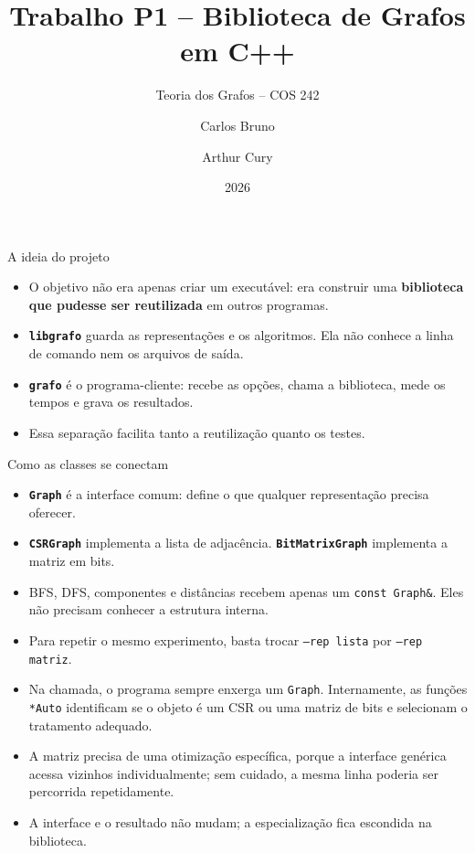 \documentclass[10pt]{beamer}
\title{Trabalho P1 -- Biblioteca de Grafos em C++}
\subtitle{Teoria dos Grafos -- COS 242}
\author{Carlos Bruno \and Arthur Cury}
\date{2026}
\institute{\url{https://github.com/Ludwigo0/TrabalhoGrafos}}
\begin{document}
\begin{frame}
\titlepage
\end{frame}

\begin{frame}{A ideia do projeto}
\begin{itemize}
\item O objetivo n\~ao era apenas criar um execut\'avel: era construir uma
\textbf{biblioteca que pudesse ser reutilizada} em outros programas.
\item \textbf{\texttt{libgrafo}} guarda as representa\c c\~oes e os algoritmos.
Ela n\~ao conhece a linha de comando nem os arquivos de sa\'ida.
\item \textbf{\texttt{grafo}} \'e o programa-cliente: recebe as op\c c\~oes,
chama a biblioteca, mede os tempos e grava os resultados.
\item Essa separa\c c\~ao facilita tanto a reutiliza\c c\~ao quanto os testes.
\end{itemize}
\end{frame}

\begin{frame}{Como as classes se conectam}
\begin{itemize}
\item \textbf{\texttt{Graph}} \'e a interface comum: define o que qualquer
representa\c c\~ao precisa oferecer.
\item \textbf{\texttt{CSRGraph}} implementa a lista de adjac\^encia.
\textbf{\texttt{BitMatrixGraph}} implementa a matriz em bits.
\item BFS, DFS, componentes e dist\^ancias recebem apenas um
\texttt{const Graph\&}. Eles n\~ao precisam conhecer a estrutura interna.
\item Para repetir o mesmo experimento, basta trocar \texttt{--rep lista} por
\texttt{--rep matriz}.
\item Na chamada, o programa sempre enxerga um \texttt{Graph}. Internamente,
as fun\c c\~oes \texttt{*Auto} identificam se o objeto \'e um CSR ou uma matriz
de bits e selecionam o tratamento adequado.
\item A matriz precisa de uma otimiza\c c\~ao espec\'ifica, porque a interface
gen\'erica acessa vizinhos individualmente; sem cuidado, a mesma linha poderia
ser percorrida repetidamente.
\item A interface e o resultado n\~ao mudam; a especializa\c c\~ao fica escondida
na biblioteca.
\end{itemize}
\end{frame}
\end{document}

